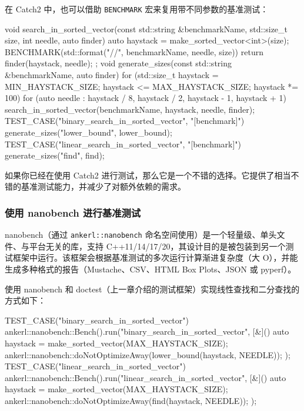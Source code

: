 \label{idx:1178}
\label{idx:1179}
在 Catch2 中，也可以借助 \texttt{BENCHMARK} 宏来复用带不同参数的基准测试：

\begin{codebox}[cpp]
void search_in_sorted_vector(const std::string &benchmarkName, std::size_t size,
                             int needle, auto finder) {
  auto haystack = make_sorted_vector<int>(size);
  BENCHMARK(std::format("{}/{}/{}", benchmarkName, needle, size)) {
    return finder(haystack, needle);
  };
}
void generate_sizes(const std::string &benchmarkName, auto finder) {
  for (std::size_t haystack = MIN_HAYSTACK_SIZE; haystack <= MAX_HAYSTACK_SIZE;
       haystack *= 100) {
    for (auto needle :
         {haystack / 8, haystack / 2, haystack - 1, haystack + 1}) {
      search_in_sorted_vector(benchmarkName, haystack, needle, finder);
    }
  }
}
TEST_CASE("binary_search_in_sorted_vector", "[benchmark]") {
  generate_sizes("lower_bound", lower_bound);
}
TEST_CASE("linear_search_in_sorted_vector", "[benchmark]") {
  generate_sizes("find", find);
}
\end{codebox}

\label{idx:1180}
\label{idx:1181}
如果你已经在使用 Catch2 进行测试，那么它是一个不错的选择。它提供了相当不错的基准测试能力，并减少了对额外依赖的需求。

\subsubsection{使用 nanobench 进行基准测试}

\label{idx:1182}
\label{idx:1183}
nanobench（通过 \texttt{ankerl::\allowbreak{}nanobench} 命名空间使用）是一个轻量级、单头文件、与平台无关的库，支持 C++11/14/17/20，其设计目的是被包装到另一个测试框架中运行。该框架会根据基准测试的多次运行计算渐进复杂度（大 O），并能生成多种格式的报告（Mustache、CSV、HTML Box Plots、JSON 或 pyperf）。

使用 nanobench 和 doctest（上一章介绍的测试框架）实现线性查找和二分查找的方式如下：

\begin{codebox}[text]
TEST_CASE("binary_search_in_sorted_vector") {
  ankerl::nanobench::Bench().run("binary_search_in_sorted_vector", [&]() {
    auto haystack = make_sorted_vector(MAX_HAYSTACK_SIZE);
    ankerl::nanobench::doNotOptimizeAway(lower_bound(haystack, NEEDLE));
  });
}
TEST_CASE("linear_search_in_sorted_vector") {
  ankerl::nanobench::Bench().run("linear_search_in_sorted_vector", [&]() {
    auto haystack = make_sorted_vector(MAX_HAYSTACK_SIZE);
    ankerl::nanobench::doNotOptimizeAway(find(haystack, NEEDLE));
  });
}
\end{codebox}

